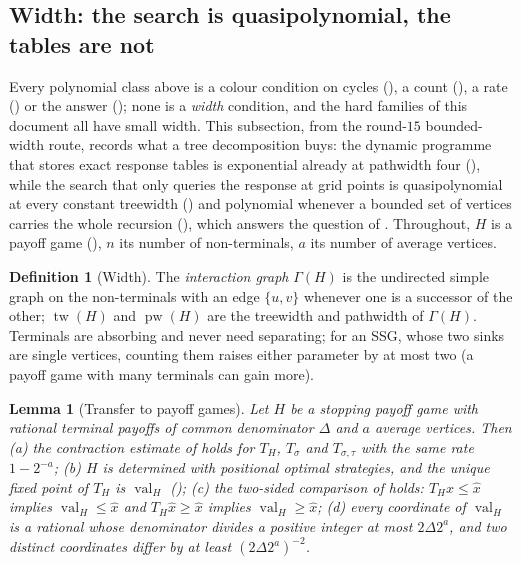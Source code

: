 \documentclass[11pt]{article}
\theoremstyle{plain}
\newtheorem{lemma}[theorem]{Lemma}
\theoremstyle{definition}
\newtheorem{definition}[theorem]{Definition}
\DeclareMathOperator{\val}{val}
\begin{document}
\subsection{Width: the search is quasipolynomial, the tables are not}\label{sec:width}

Every polynomial class above is a colour condition on cycles
(), a count (),
a rate () or the answer ();
none is a \emph{width} condition, and the hard families of this document
all have small width. This subsection, from the round-$15$ bounded-width
route, records what a tree decomposition buys: the dynamic programme that
stores exact response tables is exponential already at pathwidth four
(), while the search that only queries the response at
grid points is quasipolynomial at every constant treewidth ()
and polynomial whenever a bounded set of vertices carries the whole
recursion (), which answers the question of
. Throughout, $H$ is a payoff game (),
$n$ its number of non-terminals, $a$ its number of average vertices.

\begin{definition}[Width]\label{def:width}
The \emph{interaction graph} $\Gamma(H)$ is the undirected simple graph on
the non-terminals with an edge $\{u,v\}$ whenever one is a successor of the
other; $\operatorname{tw}(H)$ and $\operatorname{pw}(H)$ are the treewidth and pathwidth of $\Gamma(H)$.
Terminals are absorbing and never need separating; for an SSG, whose two
sinks are single vertices, counting them raises either parameter by at
most two (a payoff game with many terminals can gain more).
\end{definition}

\begin{lemma}[Transfer to payoff games]\label{lem:payoff-transfer}
Let $H$ be a stopping payoff game with rational terminal payoffs of common
denominator $\Delta$ and $a$ average vertices. Then (a) the contraction
estimate of  holds for $T_H$, $T_\sigma$ and
$T_{\sigma,\tau}$ with the same rate $1-2^{-a}$; (b) $H$ is determined
with positional optimal strategies, and the unique fixed point of $T_H$
is $\val_H$ (); (c) the two-sided
comparison of  holds: $T_H\hat x\le\hat x$ implies
$\val_H\le\hat x$ and $T_H\hat x\ge\hat x$ implies $\val_H\ge\hat x$; (d)
every coordinate of $\val_H$ is a rational whose denominator divides a
positive integer at most $2\Delta2^{a}$, and two distinct coordinates
differ by at least $(2\Delta2^{a})^{-2}$.
\end{lemma}
\end{document}
